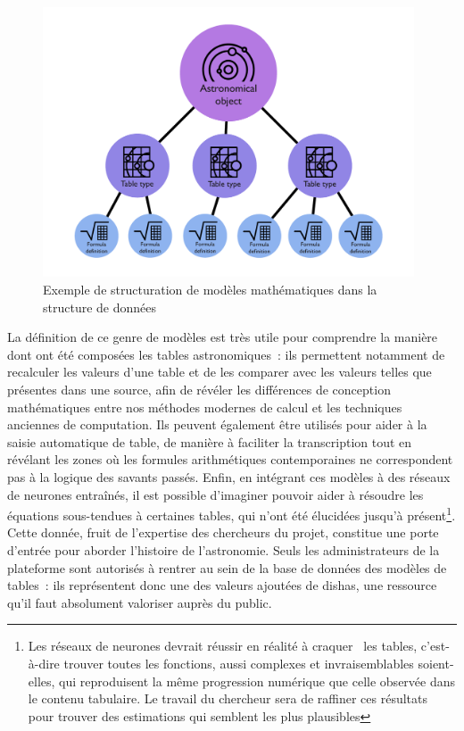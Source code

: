 \documentclass[a4paper,12pt,twoside]{book}
\newcommand{\g}[1]{\og#1~\fg}
\newcommand{\dishas}{\gls{dishas}\xspace}
\begin{document}
\begin{figure}[h!]
	\centering
	\includegraphics[width=11cm]{Images/Table-models.png}
	\caption{Exemple de structuration de modèles mathématiques dans la structure de données}
\end{figure}

La définition de ce genre de modèles est très utile pour comprendre la manière dont ont été composées les tables astronomiques~: ils permettent notamment de recalculer les valeurs d'une table et de les comparer avec les valeurs telles que présentes dans une source, afin de révéler les différences de conception mathématiques entre nos méthodes modernes de calcul et les techniques anciennes de computation. Ils peuvent également être utilisés pour aider à la saisie automatique de table, de manière à faciliter la transcription tout en révélant les zones où les formules arithmétiques contemporaines ne correspondent pas à la logique des savants passés. Enfin, en intégrant ces modèles à des réseaux de neurones entraînés, il est possible d'imaginer pouvoir aider à résoudre les équations sous-tendues à certaines tables, qui n'ont été élucidées jusqu'à présent\footnote{Les réseaux de neurones devrait réussir en réalité à \g{craquer} les tables, c'est-à-dire trouver toutes les fonctions, aussi complexes et invraisemblables soient-elles, qui reproduisent la même progression numérique que celle observée dans le contenu tabulaire. Le travail du chercheur sera de raffiner ces résultats pour trouver des estimations qui semblent les plus plausibles}.\\

Cette donnée, fruit de l'expertise des chercheurs du projet, constitue une porte d'entrée pour aborder l'histoire de l'astronomie. Seuls les administrateurs de la plateforme sont autorisés à rentrer au sein de la base de données des modèles de tables~: ils représentent donc une des valeurs ajoutées de \dishas, une ressource qu'il faut absolument valoriser auprès du public.
\end{document}

